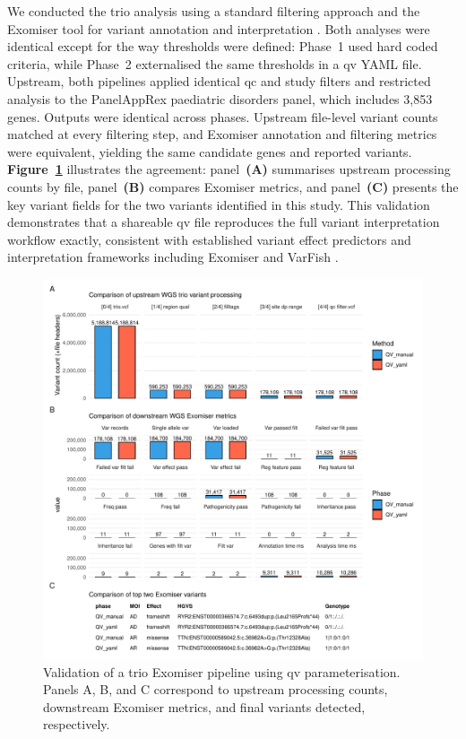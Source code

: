 We conducted the trio analysis using a standard filtering approach and the Exomiser tool for variant annotation and interpretation \cite{2020ciprianiImprovedPhenotypeDrivenTool}. Both analyses were identical except for the way thresholds were defined: Phase~1 used hard coded criteria, while Phase~2 externalised the same thresholds in a \ac{qv} YAML file. Upstream, both pipelines applied identical \ac{qc} and study filters and restricted analysis to the PanelAppRex paediatric disorders panel, which includes 3{,}853 genes.
Outputs were identical across phases. Upstream file-level variant counts matched at every filtering step, and Exomiser annotation and filtering metrics were equivalent, yielding the same candidate genes and reported variants. \textbf{Figure~\ref{fig:qv_exomiser_validation}} illustrates the agreement: panel~\textbf{(A)} summarises upstream processing counts by file, panel~\textbf{(B)} compares Exomiser metrics, and panel~\textbf{(C)} presents the key variant fields for the two variants identified in this study. This validation demonstrates that a shareable \ac{qv} file reproduces the full variant interpretation workflow exactly, consistent with established variant effect predictors 
\cite{2024riccioVariantEffectPredictors}
and interpretation frameworks including Exomiser and VarFish \cite{2020ciprianiImprovedPhenotypeDrivenTool, 2020holtgreweVarFishComprehensiveDNA}.

\begin{figure}[!t]
\centering
\includegraphics[width=\textwidth]{./images/qv_exomiser/exomiser_validation_bars_facet_metric.pdf}
\caption{Validation of a trio Exomiser pipeline using \ac{qv} parameterisation. Panels A, B, and C correspond to upstream processing counts, downstream Exomiser metrics, and final variants detected, respectively.}
\label{fig:qv_exomiser_validation}
\end{figure}


